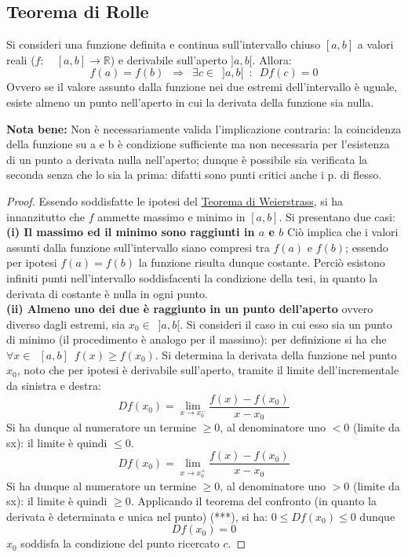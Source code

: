 \documentclass[10pt]{article}
\theoremstyle{plain}
\begin{document}
\subsection{Teorema di Rolle}
\begin{ther}
Si consideri una funzione definita e continua sull'intervallo chiuso $[a,b]$ a valori reali ($f : \enspace \enspace [a, b] \rightarrow \mathbb{R}$) e derivabile sull'aperto $]a, b[$. Allora:
\[f(a) = f(b) \enspace \Longrightarrow \enspace \exists c \in \enspace ]a, b[ \enspace : \enspace Df(c) = 0\]
Ovvero se il valore assunto dalla funzione nei due estremi dell'intervallo è uguale, esiste almeno un punto nell'aperto in cui la derivata della funzione sia nulla.
\end{ther}
\textbf{Nota bene:} Non è necessariamente valida l'implicazione contraria: la coincidenza della funzione su a e b è condizione sufficiente ma non necessaria per l'esistenza di un punto a derivata nulla nell'aperto; dunque è possibile sia verificata la seconda senza che lo sia la prima: difatti sono punti critici anche i p. di flesso.
\begin{proof}
Essendo soddisfatte le ipotesi del \hyperlink{weierstrass}{Teorema di Weierstrass}, si ha innanzitutto che $f$ ammette massimo e minimo in $[a, b]$. Si presentano due casi:
\textbf{(i) Il massimo ed il minimo sono raggiunti in $a$ e $b$} Ciò implica che i valori assunti dalla funzione sull'intervallo siano compresi tra $f(a)$ e $f(b)$; essendo per ipotesi $f(a) = f(b)$ la funzione risulta dunque costante. Perciò esistono infiniti punti nell'intervallo soddisfacenti la condizione della tesi, in quanto la derivata di costante è nulla in ogni punto. \\
\textbf{(ii) Almeno uno dei due è raggiunto in un punto dell'aperto} ovvero diverso dagli estremi, sia $x_0 \in \enspace ]a, b[$.
Si consideri il caso in cui esso sia un punto di minimo (il procedimento è analogo per il massimo): per definizione si ha che $\forall x \in \enspace [a, b] \enspace f(x) \geq f(x_0)$. Si determina la derivata della funzione nel punto $x_0$, noto che per ipotesi è derivabile sull'aperto, tramite il limite dell'incrementale da sinistra e destra:
\[D f(x_0) = \lim \limits_{x \rightarrow x_0^-} \frac{f(x) - f(x_0)}{x - x_0}\]
Si ha dunque al numeratore un termine $\geq 0$, al denominatore uno $< 0$ (limite da sx): il limite è quindi $\leq 0$.
\[D f(x_0) = \lim \limits_{x \rightarrow x_0^+} \frac{f(x) - f(x_0)}{x - x_0}\]
Si ha dunque al numeratore un termine $\geq 0$, al denominatore uno $> 0$ (limite da sx): il limite è quindi $\geq 0$.
Applicando il teorema del confronto (in quanto la derivata è determinata e unica nel punto) \hypertarget{confr}{(***)}, si ha: $0 \leq Df(x_0) \leq 0$  dunque \[Df(x_0) = 0\]
$x_0$ soddisfa la condizione del punto ricercato $c$.
\end{proof}
\end{document}
